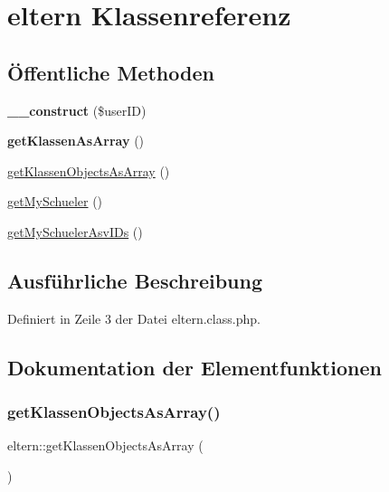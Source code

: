 \hypertarget{classeltern}{}\section{eltern Klassenreferenz}
\label{classeltern}
\subsection*{Öffentliche Methoden}
\begin{DoxyCompactItemize}
\item 
\mbox{\label{classeltern_add9bcadc7146f02d897f2555d465ddaa}} 
{\bfseries \+\_\+\+\_\+construct} (\$user\+ID)
\item 
\mbox{\label{classeltern_a6360bcd6b2656677df2ea1a5a59f7934}} 
{\bfseries get\+Klassen\+As\+Array} ()
\item 
\mbox{\hyperlink{classeltern_a4e5fec006211b6324ff159c0a52f417a}{get\+Klassen\+Objects\+As\+Array}} ()
\item 
\mbox{\hyperlink{classeltern_a14510cab17b6cd5a312ec8f4e130bbc7}{get\+My\+Schueler}} ()
\item 
\mbox{\hyperlink{classeltern_ae32e1b8fad19483f6107891a32d13e10}{get\+My\+Schueler\+Asv\+I\+Ds}} ()
\end{DoxyCompactItemize}


\subsection{Ausführliche Beschreibung}


Definiert in Zeile 3 der Datei eltern.\+class.\+php.



\subsection{Dokumentation der Elementfunktionen}
\mbox{\label{classeltern_a4e5fec006211b6324ff159c0a52f417a}} 
\subsubsection{\texorpdfstring{get\+Klassen\+Objects\+As\+Array()}{getKlassenObjectsAsArray()}}
{\footnotesize\ttfamily eltern\+::get\+Klassen\+Objects\+As\+Array (\begin{DoxyParamCaption}{ }\end{DoxyParamCaption})}

